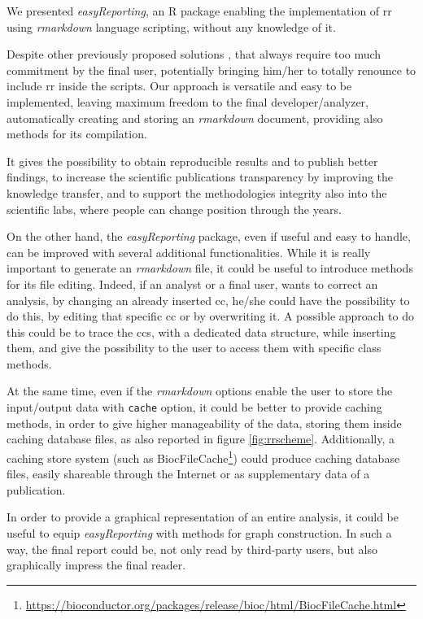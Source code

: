 We presented \textit{easyReporting}, an R package enabling the implementation of \gls{rr} using \textit{rmarkdown} language scripting, without any knowledge of it.

Despite other  previously proposed solutions \cite{Napolitano2013, Napolitano2017}, that always require too much commitment by the final user, potentially bringing him/her to totally renounce to include \gls{rr} inside the scripts.
Our approach is versatile and easy to be implemented, leaving maximum freedom to the final developer/analyzer, automatically creating and storing an \textit{rmarkdown} document, providing also methods for its compilation.

It gives the possibility to obtain reproducible results and to publish better findings, to increase the scientific publications transparency by improving the knowledge transfer, and to support the methodologies integrity also into the scientific labs, where people can change position through the years.

On the other hand, the \textit{easyReporting} package, even if useful and easy to handle, can be improved with several additional functionalities.
While it is really important to generate an \textit{rmarkdown} file, it could be useful to introduce methods for its file editing. 
Indeed, if an analyst or a final user, wants to correct an analysis, by changing an already inserted \gls{cc}, he/she could have the possibility to do this, by editing that specific \gls{cc} or by overwriting it.
A possible approach to do this could be to trace the \glspl{cc}, with a dedicated data structure, while inserting them, and give the possibility to the user to access them with specific class methods.

At the same time, even if the \textit{rmarkdown} options enable the user to store the input/output data with \lstinline!cache! option, it could be better to provide caching methods, in order to give higher manageability of the data, storing them inside caching database files, as also reported in figure \ref{fig:rrscheme}.
Additionally, a caching store system (such as BiocFileCache\footnote{\url{https://bioconductor.org/packages/release/bioc/html/BiocFileCache.html}}) could produce caching database files, easily shareable through the Internet or as supplementary data of a publication.

In order to provide a graphical representation of an entire analysis, it could be useful to equip \textit{easyReporting} with methods for graph construction.
In such a way, the final report could be, not only read by third-party users, but also graphically impress the final reader.


